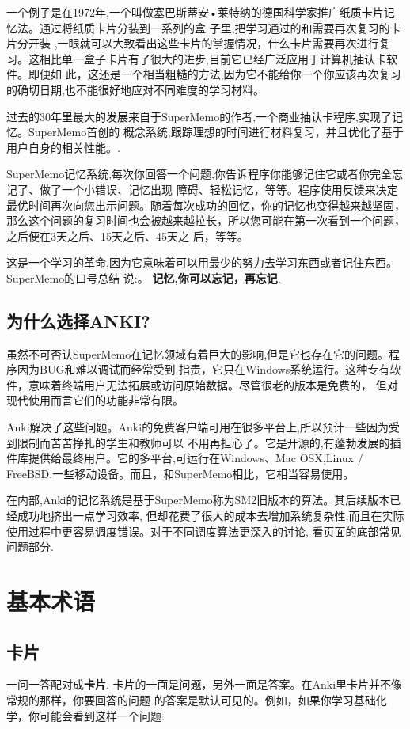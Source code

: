 \documentclass[a4paper]{book}
\begin{document}
	一个例子是在1972年,一个叫做塞巴斯蒂安•莱特纳的德国科学家推广纸质卡片记忆法。通过将纸质卡片分装到一系列的盒 子里,把学习通过的和需要再次复习的卡片分开装 ,一眼就可以大致看出这些卡片的掌握情况，什么卡片需要再次进行复习。这相比单一盒子卡片有了很大的进步,目前它已经广泛应用于计算机抽认卡软件。即便如 此，这还是一个相当粗糙的方法,因为它不能给你一个你应该再次复习的确切日期,也不能很好地应对不同难度的学习材料。
	
	过去的30年里最大的发展来自于SuperMemo的作者,一个商业抽认卡程序,实现了记忆。SuperMemo首创的 概念系统,跟踪理想的时间进行材料复习，并且优化了基于用户自身的相关性能。.
	
	SuperMemo记忆系统,每次你回答一个问题,你告诉程序你能够记住它或者你完全忘记了、做了一个小错误、记忆出现 障碍、轻松记忆，等等。程序使用反馈来决定最优时间再次向您出示问题。随着每次成功的回忆，你的记忆也变得越来越坚固， 那么这个问题的复习时间也会被越来越拉长，所以您可能在第一次看到一个问题，之后便在3天之后、15天之后、45天之 后，等等。
	
	这是一个学习的革命,因为它意味着可以用最少的努力去学习东西或者记住东西。SuperMemo的口号总结 说:。 \textbf{记忆,你可以忘记，再忘记}.
	
	\section{为什么选择ANKI?}
	虽然不可否认SuperMemo在记忆领域有着巨大的影响,但是它也存在它的问题。程序因为BUG和难以调试而经常受到 指责，它只在Windows系统运行。这种专有软件，意味着终端用户无法拓展或访问原始数据。尽管很老的版本是免费的， 但对现代使用而言它们的功能非常有限。
	
	Anki解决了这些问题。Anki的免费客户端可用在很多平台上,所以预计一些因为受到限制而苦苦挣扎的学生和教师可以 不用再担心了。它是开源的,有蓬勃发展的插件库提供给最终用户。它的多平台,可运行在Windows、Mac OSX,Linux / FreeBSD,一些移动设备。而且，和SuperMemo相比，它相当容易使用。
	
	在内部,Anki的记忆系统是基于SuperMemo称为SM2旧版本的算法。其后续版本已经成功地挤出一点学习效率, 但却花费了很大的成本去增加系统复杂性,而且在实际使用过程中更容易调度错误。对于不同调度算法更深入的讨论, 看页面的底部\hyperref[what-algorithm]{常见问题}部分.
	
	\chapter{基本术语}\label{basics}
	
	\section{卡片}\label{templates}
	一问一答配对成\textbf{卡片}. 卡片的一面是问题，另外一面是答案。在Anki里卡片并不像常规的那样，你要回答的问题 的答案是默认可见的。例如，如果你学习基础化学，你可能会看到这样一个问题:
	
\end{document}

